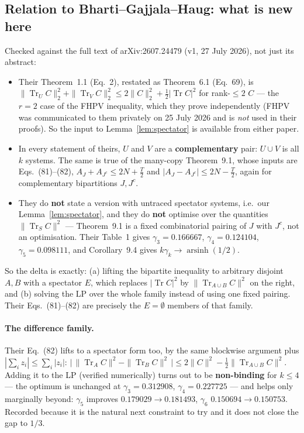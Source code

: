 \documentclass[11pt]{article}
\theoremstyle{definition}
\theoremstyle{plain}
\newcommand{\Tr}{\operatorname{Tr}}
\begin{document}
\subsection{Relation to Bharti--Gajjala--Haug: what is new here}
\label{sec:novelty}

Checked against the full text of arXiv:2607.24479 (v1, 27 July 2026), not just its abstract:

\begin{itemize}
\item Their Theorem~1.1 (Eq.~2), restated as Theorem~6.1 (Eq.~69), is
$\|\Tr_UC\|_2^2+\|\Tr_VC\|_2^2\le2\|C\|_2^2+\tfrac12|\Tr C|^2$ for rank-$\le2$ $C$ --- the
$r=2$ case of the FHPV inequality, which they prove independently (FHPV was communicated to
them privately on 25 July 2026 and is \emph{not} used in their proofs). So the input to
Lemma~\ref{lem:spectator} is available from either paper.
\item In every statement of theirs, $U$ and $V$ are a \textbf{complementary} pair:
$U\cup V$ is all $k$ systems. The same is true of the many-copy Theorem~9.1, whose
inputs are Eqs.~(81)--(82), $A_J+A_{J^c}\le2N+\tfrac T2$ and $|A_J-A_{J^c}|\le2N-\tfrac T2$,
again for complementary bipartitions $J,J^c$.
\item They do \textbf{not} state a version with untraced spectator systems, i.e.\ our
Lemma~\ref{lem:spectator}, and they do \textbf{not} optimise over the quantities
$\|\Tr_SC\|^2$ --- Theorem~9.1 is a fixed combinatorial pairing of $J$ with $J^c$, not an
optimisation. Their Table~1 gives $\gamma_3=0.166667$, $\gamma_4=0.124104$,
$\gamma_5=0.098111$, and Corollary~9.4 gives $k\gamma_k\to\operatorname{arsinh}(1/2)$.
\end{itemize}

So the delta is exactly: (a) lifting the bipartite inequality to arbitrary disjoint $A,B$
with a spectator $E$, which replaces $|\Tr C|^2$ by $\|\Tr_{A\cup B}C\|^2$ on the right, and
(b) solving the LP over the whole family instead of using one fixed pairing. Their
Eqs.~(81)--(82) are precisely the $E=\emptyset$ members of that family.

\paragraph{The difference family.} Their Eq.~(82) lifts to a spectator form too, by the
same blockwise argument plus $|\sum_iz_i|\le\sum_i|z_i|$:
$\big|\,\|\Tr_AC\|^2-\|\Tr_BC\|^2\,\big|\le2\|C\|^2-\tfrac12\|\Tr_{A\cup B}C\|^2$. Adding it
to the LP (verified numerically) turns out to be \textbf{non-binding} for $k\le4$ --- the
optimum is unchanged at $\gamma_3=0.312908$, $\gamma_4=0.227725$ --- and helps only
marginally beyond: $\gamma_5$ improves $0.179029\to0.181493$, $\gamma_6$
$0.150694\to0.150753$. Recorded because it is the natural next constraint to try and it
does not close the gap to $1/3$.
\end{document}
